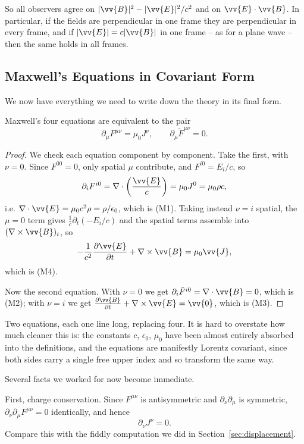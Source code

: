 So all observers agree on $|\vv{B}|^2 - |\vv{E}|^2/c^2$ and on $\vv{E}\cdot\vv{B}$. In particular, if the fields are perpendicular in one frame they are perpendicular in every frame, and if $|\vv{E}| = c|\vv{B}|$ in one frame -- as for a plane wave -- then the same holds in all frames.

\subsection{Maxwell's Equations in Covariant Form}

We now have everything we need to write down the theory in its final form.

\begin{theorem}
	Maxwell's four equations are equivalent to the pair
	$$
	\partial_\mu F^{\mu\nu} = \mu_0 J^\nu, \qquad \partial_\mu \tilde F^{\mu\nu} = 0.
	$$
\end{theorem}
\begin{proof}
	We check each equation component by component. Take the first, with $\nu = 0$. Since $F^{00} = 0$, only spatial $\mu$ contribute, and $F^{i0} = E_i/c$, so
	$$
	\partial_i F^{i0} = \nabla\cdot\left(\frac{\vv{E}}{c}\right) = \mu_0 J^0 = \mu_0 \rho c,
	$$
	i.e. $\nabla\cdot\vv{E} = \mu_0 c^2 \rho = \rho/\epsilon_0$, which is (M1). Taking instead $\nu = i$ spatial, the $\mu = 0$ term gives $\frac{1}{c}\partial_t(-E_i/c)$ and the spatial terms assemble into $(\nabla\times\vv{B})_i$, so
	$$
	-\frac{1}{c^2}\frac{\partial \vv{E}}{\partial t} + \nabla\times\vv{B} = \mu_0\vv{J},
	$$
	which is (M4).

	Now the second equation. With $\nu = 0$ we get $\partial_i \tilde F^{i0} = \nabla\cdot\vv{B} = 0$, which is (M2); with $\nu = i$ we get $\frac{\partial \vv{B}}{\partial t} + \nabla\times\vv{E} = \vv{0}$, which is (M3).
\end{proof}

Two equations, each one line long, replacing four. It is hard to overstate how much cleaner this is: the constants $c$, $\epsilon_0$, $\mu_0$ have been almost entirely absorbed into the definitions, and the equations are manifestly Lorentz covariant, since both sides carry a single free upper index and so transform the same way.

Several facts we worked for now become immediate.

First, charge conservation. Since $F^{\mu\nu}$ is antisymmetric and $\partial_\nu\partial_\mu$ is symmetric, $\partial_\nu\partial_\mu F^{\mu\nu} = 0$ identically, and hence
$$
\partial_\nu J^\nu = 0.
$$
Compare this with the fiddly computation we did in Section~\ref{sec:displacement}.


